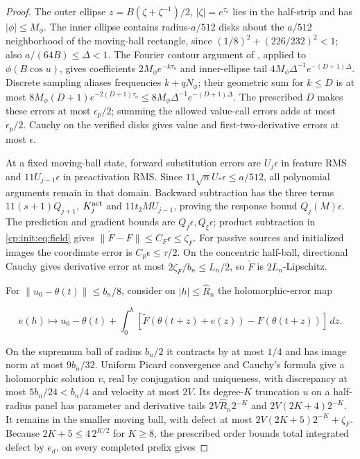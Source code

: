 \begin{proof}
The outer ellipse $z=B(\zeta+\zeta^{-1})/2$,
$|\zeta|=e^{\tau_o}$ lies in the half-strip and has
$|\phi|\le M_\phi$. The inner ellipse contains radius-$a/512$
disks about the $a/512$ neighborhood of the moving-ball rectangle,
since $(1/8)^2+(226/232)^2<1$; also
$a/(64B)\le\Delta<1$. The Fourier contour argument of
, applied to $\phi(B\cos u)$,
gives coefficients $2M_\phi e^{-k\tau_o}$ and inner-ellipse tail
$4M_\phi\Delta^{-1}e^{-(D+1)\Delta}$.
Discrete sampling aliases frequencies $k+qN_\phi$; their geometric
sum for $k\le D$ is at most
$8M_\phi(D+1)e^{-2(D+1)\tau_o}
\le8M_\phi\Delta^{-1}e^{-(D+1)\Delta}$.
The prescribed $D$ makes these errors at most $\epsilon_p/2$;
summing the allowed value-call errors adds at most $\epsilon_p/2$.
Cauchy on the verified disks gives value and first-two-derivative
errors at most $\epsilon$.

At a fixed moving-ball state, forward substitution errors are
$U_j\epsilon$ in feature RMS and $11U_{j-1}\epsilon$ in
preactivation RMS. Since $11\sqrt nU_*\epsilon\le a/512$,
all polynomial arguments remain in that domain. Backward subtraction
has the three terms $11(s+1)Q_{j+1}$, $K_j^{\rm act}$ and
$11t_2MU_{j-1}$, proving the response bound $Q_j(M)\epsilon$.
The prediction and gradient bounds are $Q_f\epsilon,Q_\xi\epsilon$;
product subtraction in \eqref{cp:init:eq:field} gives
$\|\widetilde F-F\|\le C_F\epsilon\le\zeta_F$.
For passive sources and initialized images the coordinate error is
$C_p\epsilon\le\tau/2$. On the concentric half-ball,
directional Cauchy gives derivative error at most
$2\zeta_F/b_n\le L_n/2$, so $\widetilde F$ is $2L_n$-Lipschitz.

For $\|u_0-\theta(t)\|\le b_n/8$, consider on
$|h|\le\widehat R_n$ the holomorphic-error map

\[
e(h)\longmapsto u_0-\theta(t)+
 \int_0^h[\widetilde F(\theta(t+z)+e(z))-F(\theta(t+z))]\,dz.
\]

On the supremum ball of radius $b_n/2$ it contracts by at most
$1/4$ and has image norm at most $9b_n/32$.
Uniform Picard convergence and Cauchy's formula give a holomorphic
solution $v$, real by conjugation and uniqueness, with discrepancy
at most $5b_n/24<b_n/4$ and velocity at most $2V$.
Its degree-$K$ truncation $u$ on a half-radius panel has parameter
and derivative tails $2V\widehat R_n2^{-K}$ and
$2V(2K+4)2^{-K}$. It remains in the smaller moving ball, with
defect at most $2V(2K+5)2^{-K}+\zeta_F$.
Because $2K+5\le4\,2^{K/2}$ for $K\ge8$, the prescribed order
bounds total integrated defect by $e_d$. 
on every completed prefix gives


\end{proof}
